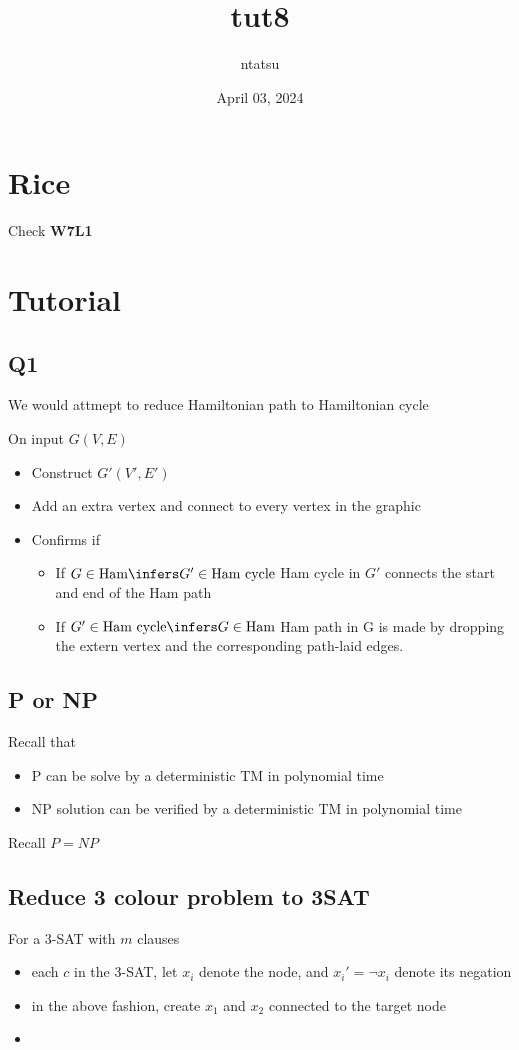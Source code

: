 \documentclass{article}
\title{tut8}
\author{ntatsu}
\date{April 03, 2024}
\newcommand{\tb}[1]{\textbf{#1}}
\theoremstyle{definition}
\theoremstyle{remark}
\begin{document}
\maketitle

\section{Rice}


Check \tb{W7L1}

\section{Tutorial}

\subsection{Q1}
We would attmept to reduce Hamiltonian path to Hamiltonian cycle

On input $G(V, E)$
\begin{itemize}
    \item Construct $G'(V', E')$
    \item Add an extra vertex and connect to every vertex in the graphic
    \item Confirms if
    \begin{itemize}
        \item If $G \in \text{Ham} \infers G' \in \text{Ham cycle}$ Ham cycle in $G'$ connects the start and end of the Ham path
        \item If $G' \in \text{Ham cycle} \infers G \in \text{Ham}$ Ham path in G is made by dropping the extern vertex and the corresponding path-laid edges.
    \end{itemize}
\end{itemize}

\subsection{P or NP}
Recall that
\begin{itemize}
    \item P can be solve by a deterministic TM in polynomial time
    \item NP solution can be verified by a deterministic TM in polynomial time
\end{itemize}

Recall $P = NP$

\subsection{Reduce 3 colour problem to 3SAT}
For a 3-SAT with $m$ clauses
\begin{itemize}
    \item each $c$ in the 3-SAT, let $x_i$ denote the node, and $x_i' = \neg x_i$ denote its negation
    \item in the above fashion, create $x_1$ and $x_2$ connected to the target node
    \item 
\end{itemize}
\end{document}
